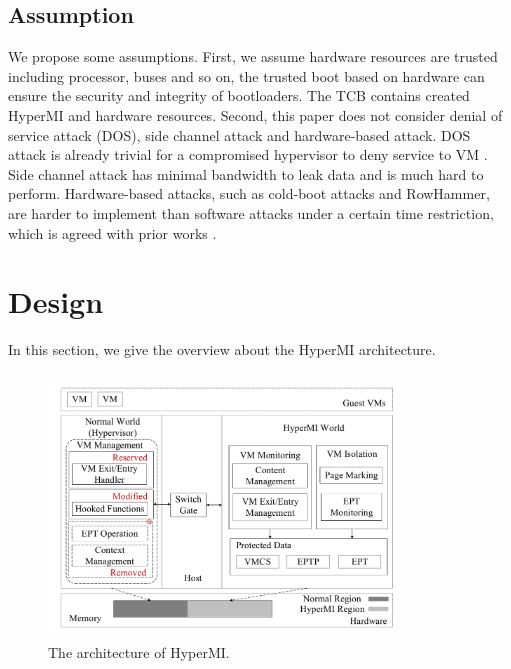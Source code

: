 \documentclass[conference]{IEEEtran}
\begin{document}
\subsection{Assumption}
We propose some assumptions.
First, we assume hardware resources are trusted including processor, buses and so on, the trusted boot based on hardware can ensure the security and integrity of bootloaders. The TCB contains created HyperMI and hardware resources. Second, this paper does not consider denial of service attack (DOS), side channel attack and hardware-based attack. DOS attack is already trivial for a compromised hypervisor to deny service to VM \cite{Wang2015DDoS}. Side channel attack has minimal bandwidth to leak data and is much hard to perform. Hardware-based attacks, such as cold-boot attacks and RowHammer, are harder to implement than software attacks under a certain time restriction, which is agreed with prior works \cite{Zhang2011CloudVisor}.

\section{Design}
In this section, we give the overview about the HyperMI architecture.%
\begin{figure}
\centerline{\includegraphics[width=9.5cm, height=7cm]{pdfvmcs1.pdf}}%
\caption{The architecture of HyperMI. } \label{fig1}
\end{figure}
\end{document}
